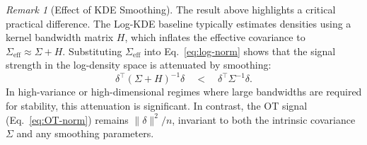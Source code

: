 \documentclass{article}
\theoremstyle{plain}
\newtheorem{theorem}{Theorem}[section]
\theoremstyle{definition}
\theoremstyle{remark}
\newtheorem{remark}[theorem]{Remark}
\begin{document}
\begin{remark}[Effect of KDE Smoothing]
The result above highlights a critical practical difference. The Log-KDE baseline typically estimates densities using a kernel bandwidth matrix $H$, which inflates the effective covariance to $\Sigma_{\text{eff}} \approx \Sigma + H$.
Substituting $\Sigma_{\text{eff}}$ into Eq.~\eqref{eq:log-norm} shows that the signal strength in the log-density space is attenuated by smoothing:
\[
  \delta^\top (\Sigma+H)^{-1} \delta \quad < \quad \delta^\top \Sigma^{-1} \delta.
\]
In high-variance or high-dimensional regimes where large bandwidths are required for stability, this attenuation is significant. In contrast, the OT signal (Eq.~\eqref{eq:OT-norm}) remains $\|\delta\|^2/n$, invariant to both the intrinsic covariance $\Sigma$ and any smoothing parameters.
\end{remark}















\end{document}
